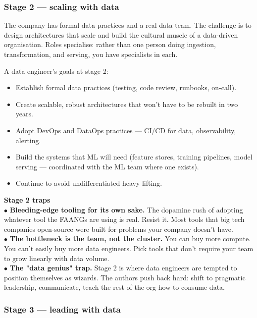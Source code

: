 \subsubsection{Stage 2 — scaling with data}

The company has formal data practices and a real data team. The challenge is to design architectures that scale and build the cultural muscle of a data-driven organisation. Roles specialise: rather than one person doing ingestion, transformation, and serving, you have specialists in each.

A data engineer's goals at stage 2:
\begin{itemize}[leftmargin=*]
  \item Establish formal data practices (testing, code review, runbooks, on-call).
  \item Create scalable, robust architectures that won't have to be rebuilt in two years.
  \item Adopt DevOps and DataOps practices — CI/CD for data, observability, alerting.
  \item Build the systems that ML will need (feature stores, training pipelines, model serving — coordinated with the ML team where one exists).
  \item Continue to avoid undifferentiated heavy lifting.
\end{itemize}

\begin{warnbox}
\textbf{Stage 2 traps}\\
$\bullet$ \textbf{Bleeding-edge tooling for its own sake.} The dopamine rush of adopting whatever tool the FAANGs are using is real. Resist it. Most tools that big tech companies open-source were built for problems your company doesn't have.\\
$\bullet$ \textbf{The bottleneck is the team, not the cluster.} You can buy more compute. You can't easily buy more data engineers. Pick tools that don't require your team to grow linearly with data volume.\\
$\bullet$ \textbf{The "data genius" trap.} Stage 2 is where data engineers are tempted to position themselves as wizards. The authors push back hard: shift to pragmatic leadership, communicate, teach the rest of the org how to consume data.
\end{warnbox}

\subsubsection{Stage 3 — leading with data}

